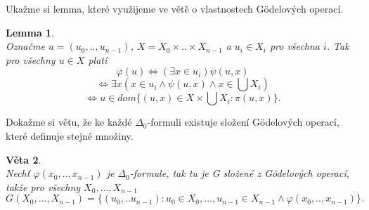 \documentclass[12pt,a4paper]{article}
\newtheorem{veta}{V\v{e}ta}[section]%
\newtheorem{lemma}[veta]{Lemma}
\begin{document}
\newpage
Uka\v{z}me si lemma, kter\'{e} vyu\v{z}ijeme ve v\v{e}t\v{e} o vlastnostech  G\"{o}delov\'{y}ch operac\'{i}.
\begin{lemma}
~\\
\label{lem:for}
Ozna\v{c}me $ u=(u_0,..,u_{n-1}) $, $  X=X_0 \times .. \times X_{n-1} $ a $ u_i \in X_i $ pro v\v{s}echna $ i $. Tak pro v\v{s}echny $ u \in X $ plat\'{i}
\[ \varphi(u)  \Leftrightarrow (\exists x \in u_i) \psi(u,x) \]
\[ \Leftrightarrow \exists x( x \in u_i \wedge \psi(u,x) \wedge x \in \bigcup X_i) \]
\[\Leftrightarrow  u \in dom\{(u,x) \in X \times \bigcup X_i: \pi(u,x)\} .\]
\end{lemma}
Doka\v{z}me si v\v{e}tu, \v{z}e ke ka\v{z}d\'{e} $\Delta_0$-formuli existuje slo\v{z}en\'{i} G\"{o}delov\'{y}ch operac\'{i}, kter\'{e} definuje stejn\'{e} mno\v{z}iny.
\begin{veta}
~\\\label{vet:op}
Nech\v{t} $\varphi(x_0,..,x_{n-1})$ je $\Delta_0$-formule, tak tu je G slo\v{z}en\'{e} z G\"{o}delov\'{y}ch operac\'{i}, tak\v{z}e pro v\v{s}echny $X_0,...,X_{n-1}$ 
\[ G(X_0,...,X_{n-1})=\{(u_0,..u_{n-1}): u_0 \in X_0,..., u_{n-1} \in X_{n-1} \wedge \varphi(x_0,..,x_{n-1})\}  .\]   

\end{veta}
\end{document}
